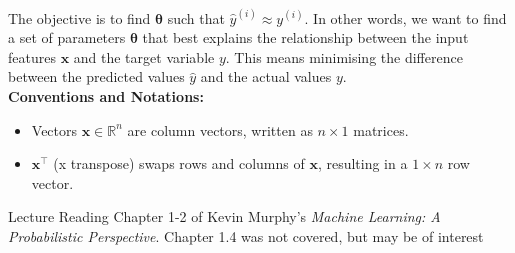 The objective is to find \(\bm{\theta}\) such that \(\hat{y}^{(i)} \approx y^{(i)}\). In other words, we want to find a set of parameters \(\bm{\theta}\) that best explains the relationship between the input features \(\bm{x}\) and the target variable \(y\). This means minimising the difference between the predicted values \(\hat{y}\) and the actual values \(y\).\\

\textbf{Conventions and Notations:}
\begin{itemize}
    \item Vectors \(\bm{x} \in \mathbb{R}^n\) are column vectors, written as \(n \times 1\) matrices.
    \item \(\bm{x}^\top\) (x transpose) swaps rows and columns of \(\bm{x}\), resulting in a \(1 \times n\) row vector.
\end{itemize}




\begin{referencebox}{Lecture Reading}
    Chapter 1-2 of Kevin Murphy's \textit{Machine Learning: A Probabilistic Perspective}. Chapter 1.4 was not covered, but may be of interest
\end{referencebox}




